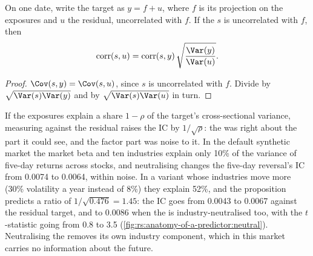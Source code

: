 \begin{proposition}\label{prop:rs:anatomy-of-a-predictor:neutral}
On one date, write the target as $y = f + u$, where $f$ is its projection on the exposures and $u$ the residual, uncorrelated
with $f$. If the  $s$ is uncorrelated with $f$, then
\[
\operatorname{corr}(s, u) = \operatorname{corr}(s, y)\,\sqrt{\frac{\Var(y)}{\Var(u)}}.
\]
\end{proposition}

\begin{proof}
$\Cov(s, y) = \Cov(s, u)$, since $s$ is uncorrelated with $f$. Divide by $\sqrt{\Var(s)\Var(y)}$ and by $\sqrt{\Var(s)\Var(u)}$
in turn.
\end{proof}

If the exposures explain a share $1 - \rho$ of the target's cross-sectional variance, measuring against the residual raises the
IC by $1/\sqrt\rho$: the  was right about the part it could see, and the factor part was noise to it. In the default
synthetic market the market beta and ten industries explain only 10\% of the variance of five-day returns across stocks, and
neutralising changes the five-day reversal's IC from 0.0074 to 0.0064, within noise. In a variant whose industries move more
(30\% volatility a year instead of 8\%) they explain 52\%, and the proposition predicts a ratio of $1/\sqrt{0.476} = 1.45$: the IC
goes from 0.0043 to 0.0067 against the residual target, and to 0.0086 when the  is industry-neutralised too, with the
$t$-statistic going from 0.8 to 3.5 (\cref{fig:rs:anatomy-of-a-predictor:neutral}). Neutralising the  removes its own
industry component, which in this market carries no information about the future.

